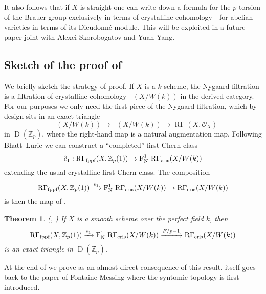 \documentclass[11pt]{article}
\theoremstyle{plain}
\newtheorem{ThmS}{Theorem}[section]
\theoremstyle{definition}
\theoremstyle{remark}
\numberwithin{equation}{section}
\newenvironment{thms}[1]%
    { \begin{ThmS} \label{T:#1}}%
    { \end{ThmS} }
\newcommand{\ths}[1]{\begin{thms}{#1} \sl }
\newcommand{\eths}{\end{thms} }
\newcommand\calO{\mathcal{O}}
\newcommand{\Zp}{\mathbb{Z}_p}
\newcommand\xto[2]{\xrightarrow[#1]{#2}}
\DeclareMathOperator{\D}{D}                                              %
\DeclareMathOperator{\Rgam}{\text{R}\Gamma}                              %
\newcommand{\W}{W}                                                       %
\DeclareMathOperator{\Rflat}{R\Gamma_{\textnormal{fppf}}}                %
\DeclareMathOperator{\Rcris}{R\Gamma_{cris}}                             %
\DeclareMathOperator{\Nyg}{F_N^1}                                      %
\begin{document}
It also follows that if $X$ is straight one can write down a formula for the $p$-torsion of the Brauer group exclusively in terms of crystalline cohomology - for abelian varieties in terms of its Dieudonné module. This will be exploited in a future paper joint with Alexei Skorobogatov and Yuan Yang.

\subsection*{Sketch of the proof of } We briefly sketch the strategy of proof. If $X$ is a $k$-scheme, the Nygaard filtration is a filtration of crystalline cohomology $\Rcris(X/\W(k))$ in the derived category. For our purposes we only need the first piece of the Nygaard filtration, which by design sits in an exact triangle 
\[
\Nyg{}\Rcris(X/\W(k))\to\Rcris(X/\W(k))\to\Rgam(X,\calO_X)
\]
in $\D(\Zp)$, where the right-hand map is a natural augmentation map. Following Bhatt--Lurie we can construct a ``completed'' first Chern class
\[
\hat{c}_1:\Rflat(X,\Zp(1))\to\Nyg{}\Rcris(X/\W(k))
\]
extending the usual crystalline first Chern class. The composition
\[
\Rflat(X,\Zp(1))\xto{}{\hat{c}_1}\Nyg{}\Rcris(X/\W(k))\to\Rcris(X/\W(k))
\]
is then the map of .

\ths{mainthmbl}(\cite[Theorem 7.3.5]{bhattlurie}, ) If $X$ is a smooth scheme over the perfect field $k$, then
\begin{equation}\label{triangolomainthm}
\Rflat(X,\Zp(1))\xto{}{\hat{c}_1}\Nyg{}\Rcris(X/\W(k))\xto{}{F/p-1}\Rcris(X/\W(k))   
\end{equation}
is an exact triangle in $\D(\Zp)$.
\eths

At the end of  we prove  as an almost direct consequence of this result.  itself goes back to the paper of Fontaine-Messing \cite{fontainemessing} where the syntomic topology is first introduced.
\end{document}
